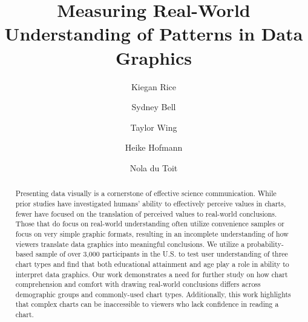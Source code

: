 \documentclass{IEEEcsmag}
\begin{document}

\title{Measuring Real-World Understanding of Patterns in Data Graphics}

\author{Kiegan Rice}

\author{Sydney Bell}

\author{Taylor Wing}

\author{Heike Hofmann}

\author{Nola du Toit}


\begin{abstract}
Presenting data visually is a cornerstone of effective science communication. While prior studies have investigated humans' ability to effectively perceive values in charts, fewer have focused on the translation of perceived values to real-world conclusions. Those that do focus on real-world understanding often utilize convenience samples or focus on very simple graphic formats, resulting in an incomplete understanding of how viewers translate data graphics into meaningful conclusions. We utilize a probability-based sample of over 3,000 participants in the U.S. to test user understanding of three chart types and find that both educational attainment and age play a role in ability to interpret data graphics. Our work demonstrates a need for further study on how chart comprehension and comfort with drawing real-world conclusions differs across demographic groups and commonly-used chart types. Additionally, this work highlights that complex charts can be inaccessible to viewers who lack confidence in reading a chart.
\end{abstract}
\end{document}
